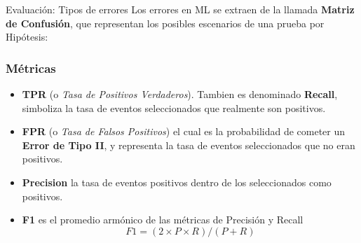 \documentclass[11pt]{beamer}
\begin{document}
\begin{frame}{Evaluaci\'on: Tipos de errores}
Los errores en ML se extraen de la llamada \textbf{Matriz de Confusi\'on}, 
que representan los posibles escenarios de una prueba por Hip\'otesis:


\end{frame}
\begin{frame} \frametitle{M\'etricas}
 \small
\begin{itemize}[<+->]
 \item \textbf{TPR} (o \textit{Tasa de Positivos Verdaderos}). Tambien es denominado \textbf{Recall}, simboliza la tasa de eventos seleccionados que realmente son positivos.
\item \textbf{FPR} (o \textit{Tasa de Falsos Positivos}) el cual es la probabilidad de cometer un \textbf{Error de Tipo II}, y representa la tasa de eventos seleccionados que no eran positivos.
\item \textbf{Precision} la tasa de eventos positivos dentro de los seleccionados como positivos.
\item \textbf{F1} es el promedio arm\'onico de las m\'etricas de Precisi\'on y Recall
$$F1 = (2 \times P \times R)/(P + R) $$
\end{itemize}
\end{frame}
\end{document}
